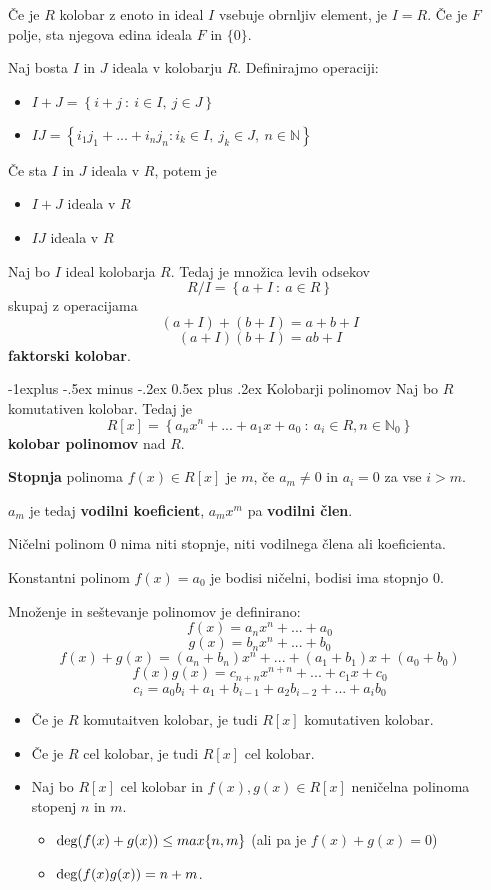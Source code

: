\documentclass[a4paper,9pt]{extarticle}
\makeatletter
\renewcommand{\subsection}{\@startsection{subsection}{2}{0mm}%
                                {-1explus -.5ex minus -.2ex}%
                                {0.5ex plus .2ex}%
                                {\normalfont\normalsize\bfseries}}
\makeatother
\begin{document}
\begin{multicols}{3}
Če je $R$ kolobar z enoto in ideal $I$ vsebuje obrnljiv element, je $I = R$.
Če je $F$ polje, sta njegova edina ideala $F$ in $\{0\}$.


Naj bosta $I$ in $J$ ideala v kolobarju $R$. Definirajmo operaciji:
\begin{itemize}
    \item $I+J = \left\{ i+j\ :\ i \in I,\ j\in J \right\}$
    \item $IJ = \left\{i_1j_1 + ... + i_nj_n : i_k \in I,\ j_k \in J,\ n \in \mathbb{N}\right\}$
\end{itemize}
Če sta $I$ in $J$ ideala v $R$, potem je
\begin{itemize}
    \item $I+J$ ideala v $R$
    \item $IJ$ ideala v $R$
\end{itemize}

Naj bo $I$ ideal kolobarja $R$. Tedaj je množica levih odsekov
\[R/I = \left\{ a+I\ :\ a \in R \right\}\]
skupaj z operacijama
\[(a+I) + (b+I) = a+b+I\]
\[(a+I)(b+I) = ab+I\]
\textbf{faktorski kolobar}.

\subsection{Kolobarji polinomov}
Naj bo $R$ komutativen kolobar. Tedaj je
\[R[x] = \left\{ a_nx^n + ... + a_1x + a_0\ :\ a_i \in R, n \in \mathbb{N}_0 \right\}\]
\textbf{kolobar polinomov} nad $R$.

\textbf{Stopnja} polinoma $f(x) \in R[x]$ je $m$, če $a_m \neq 0$ in $a_i = 0$ za vse $i>m$.

$a_m$ je tedaj \textbf{vodilni koeficient}, $a_mx^m$ pa \textbf{vodilni člen}.

Ničelni polinom $0$ nima niti stopnje, niti vodilnega člena ali koeficienta.

Konstantni polinom $f(x) = a_0$ je bodisi ničelni, bodisi ima stopnjo $0$.

Množenje in seštevanje polinomov je definirano:
\[f(x) = a_nx^n + ... + a_0\]
\[g(x) = b_nx^n + ... + b_0\]
\[f(x)+g(x) = (a_n+b_n)x^n + ... + (a_1 + b_1)x + (a_0 + b_0)\]
\[f(x)g(x) = c_{n+n}x^{n+n} + ... + c_1x + c_0 \]
\[c_i = a_0b_i + a_1+b_{i-1} + a_2b_{i-2} + ... + a_ib_0\]
\begin{itemize}
    \item Če je $R$ komutaitven kolobar, je tudi $R[x]$ komutativen kolobar.
    \item Če je $R$ cel kolobar, je tudi $R[x]$ cel kolobar.
    \item Naj bo $R[x]$ cel kolobar in $f(x),g(x) \in R[x]$ neničelna polinoma stopenj $n$ in $m$.
    \begin{itemize}
        \item $\textmd{deg}(f(x)+g(x)) \leq max\{n,m\}$ (ali pa je $f(x)+g(x) = 0$)
        \item $\textmd{deg}(f(x)g(x)) = n+m$.
    \end{itemize}
\end{itemize}


\end{multicols}
\end{document}
